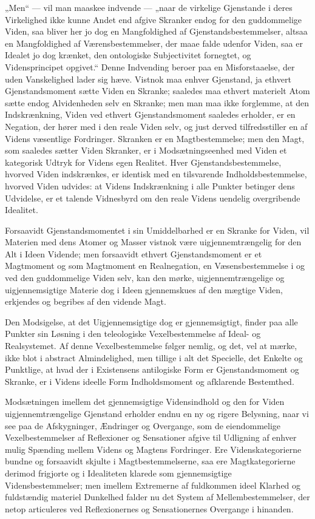 \documentclass[12pt]{book}
\newcommand{\opage}[1]{\marginnote{\footnotesize\textit{[#1]}}}
\begin{document}
„Men“ --- vil man maaskee indvende --- „naar de virkelige Gjenstande i deres Virkelighed ikke kunne
Andet end afgive Skranker endog for den guddommelige Viden, saa bliver her jo dog en Mangfoldighed af
Gjenstandsbestemmelser, altsaa en Mangfoldighed af Værensbestemmelser, der maae falde udenfor Viden,
saa er Idealet jo dog krænket, den ontologiske Subjectivitet fornegtet, og Vidensprincipet opgivet.“
Denne Indvending beroer paa en Misforstaaelse, der uden Vanskelighed lader sig hæve. Vistnok maa enhver
Gjenstand, ja ethvert Gjenstandsmoment sætte Viden en Skranke; saaledes maa ethvert materielt Atom
sætte endog Alvidenheden selv en Skranke; men man maa ikke forglemme, at den Indskrænkning, Viden ved
ethvert Gjenstandsmoment saaledes erholder, er en Negation, der hører med i den reale Viden selv, og
just derved tilfredsstiller en af Videns væsentlige Fordringer. Skranken er en Magtbestemmelse; men den
Magt, som saaledes sætter Viden Skranker, er i Modsætningseenhed med Viden et kategorisk Udtryk for
Videns egen Realitet. Hver Gjenstandsbestemmelse, hvorved Viden indskrænkes, er identisk med en
tilsvarende Indholdsbestemmelse, hvorved Viden udvides: at Videns Indskrænkning i alle Punkter betinger
dens Udvidelse, er et talende Vidnesbyrd om den reale Videns uendelig overgribende Idealitet.

Forsaavidt Gjenstandsmomentet i sin Umiddelbarhed er
\opage{262} en Skranke for Viden, vil Materien med dens Atomer og Masser vistnok være uigjennemtrængelig for den
Alt i Ideen Vidende; men forsaavidt ethvert Gjenstandsmoment er et Magtmoment og som Magtmoment en
Realnegation, en Væsensbestemmelse i og ved den guddommelige Viden selv, kan den mørke,
uigjennemtrængelige og uigjennemsigtige Materie dog i Ideen gjennemskues af den mægtige Viden,
erkjendes og begribes af den vidende Magt.

Den Modsigelse, at det Uigjennemsigtige dog er gjennemsigtigt, finder paa alle Punkter sin Løsning i
den teleologiske Vexelbestemmelse af Ideal- og Realsystemet. Af denne Vexelbestemmelse følger nemlig,
og det, vel at mærke, ikke blot i abstract Almindelighed, men tillige i alt det Specielle, det Enkelte
og Punktlige, at hvad der i Existensens antilogiske Form er Gjenstandsmoment og Skranke, er i Videns
ideelle Form Indholdsmoment og afklarende Bestemthed.

Modsætningen imellem det gjennemsigtige Vidensindhold og den for Viden uigjennemtrængelige Gjenstand
erholder endnu en ny og rigere Belysning, naar vi see paa de Afskygninger, Ændringer og Overgange, som
de eiendommelige Vexelbestemmelser af Reflexioner og Sensationer afgive til Udligning af enhver mulig
Spænding mellem Videns og Magtens Fordringer. Ere Videnskategorierne bundne og forsaavidt skjulte i
Magtbestemmelserne, saa ere Magtkategorierne derimod frigjorte og i Idealiteten klarede som
gjennemsigtige Vidensbestemmelser; men imellem Extremerne af fuldkommen ideel Klarhed og fuldstændig
materiel Dunkelhed falder nu det System af Mellembestemmelser, der netop articuleres ved Reflexionernes
og Sensationernes Overgange i hinanden.
\end{document}
